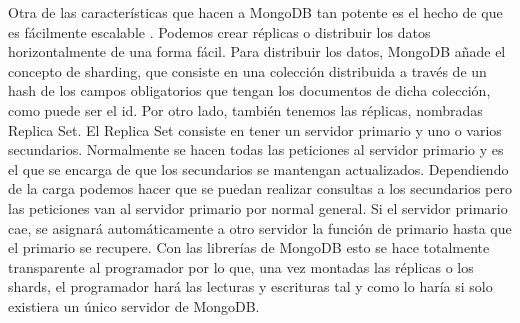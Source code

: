 Otra de las características que hacen a MongoDB tan potente es el hecho de
que es fácilmente escalable \cite{Mng-1}. Podemos crear réplicas o
distribuir los datos horizontalmente de una forma fácil. Para distribuir
los datos, MongoDB añade el concepto de sharding, que consiste en una
colección distribuida a través de un hash de los campos obligatorios que
tengan los documentos de dicha colección, como puede ser el id. Por otro
lado, también tenemos las réplicas, nombradas Replica Set. El Replica Set
consiste en tener un servidor primario y uno o varios secundarios.
Normalmente se hacen todas las peticiones al servidor primario y es el que
se encarga de que los secundarios se mantengan actualizados. Dependiendo de
la carga podemos hacer que se puedan realizar consultas a los secundarios
pero las peticiones van al servidor primario por normal general. Si el
servidor primario cae, se asignará automáticamente a otro servidor la
función de primario hasta que el primario se recupere. Con las librerías de
MongoDB esto se hace totalmente transparente al programador por lo que, una
vez montadas las réplicas o los shards, el programador hará las lecturas y
escrituras tal y como lo haría si solo existiera un único servidor de
MongoDB.

